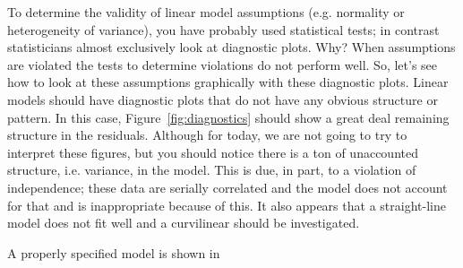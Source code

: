 \documentclass{article}\usepackage[]{graphicx}\usepackage[]{color}
\begin{document}
To determine the validity of linear model assumptions (e.g. normality or heterogeneity of variance), you have probably used statistical tests; in contrast statisticians almost exclusively look at diagnostic plots. Why?  When assumptions are violated the tests to determine violations do not perform well. So, let's see how to look at these assumptions graphically with these diagnostic plots. Linear models should have diagnostic plots that do not have any obvious structure or pattern. In this case, Figure~\ref{fig:diagnostics} should show a great deal remaining structure in the residuals. Although for today, we are not going to try to interpret these figures, but you should notice there is a ton of unaccounted structure, i.e. variance, in the model. This is due, in part, to a violation of independence; these data are serially correlated and the model does not account for that and is inappropriate because of this. It also appears that a straight-line model does not fit well and a curvilinear should be investigated.

A properly specified model is shown in 

\end{document}
